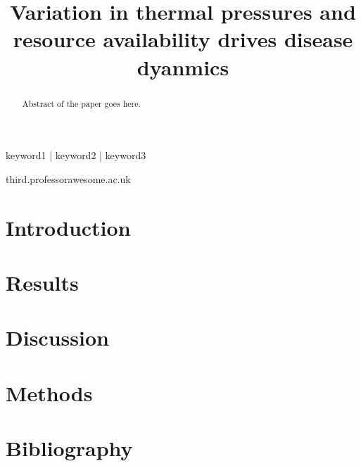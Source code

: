 
\title{Variation in thermal pressures and resource availability drives disease dyanmics}

\date{}

\maketitle

\begin{abstract}
Abstract of the paper goes here.
\lipsum[1]
\end{abstract}

\begin{keywords}
keyword1 | keyword2 | keyword3
\end{keywords}

\begin{corrauthor}
third.professor\at awesome.ac.uk
\end{corrauthor}

\section*{Introduction}\label{s:introduction}


\section*{Results}\label{s:results}


\section*{Discussion}\label{s:discussion}

\section*{Methods}\label{s:methods}


\section*{Bibliography}

